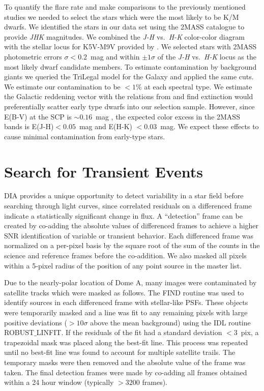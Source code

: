 To quantify the flare rate and make comparisons to the previously mentioned studies we needed to select the stars which were the most likely to be K/M dwarfs. We identified the stars in our data set using the 2MASS catalogue \citep{Skrutskie2006} to provide \textit{JHK} magnitudes. We combined the \textit{J-H} vs.~\textit{H-K} color-color diagram with the stellar locus for K5V-M9V provided by \citet{Pecaut2013}. We selected stars with 2MASS photometric errors $\sigma < 0.2$~mag and within $\pm1\sigma$ of the \textit{J-H} vs.~\textit{H-K} locus as the most likely dwarf candidate members. To estimate contamination by background giants we queried the TriLegal model \citep{Girardi2012} for the Galaxy and applied the same cuts. We estimate our contamination to be $<1\%$ at each spectral type. We estimate the Galactic reddening vector with the relations from \citet{Fitzpatrick1999} and find extinction would preferentially scatter early type dwarfs into our selection sample. However, since E(B-V) at the SCP is $\sim0.16$~mag \citet{Schlafly2011}, the expected color excess in the 2MASS bands is E(J-H)$<0.05$~mag and E(H-K) $< 0.03$~mag.  We expect these effects to cause minimal contamination from early-type stars.

\section{Search for Transient Events}

DIA provides a unique opportunity to detect variability in a star field before searching through light curves, since correlated residuals on a differenced frame indicate a statistically significant change in flux. A ``detection'' frame can be created by co-adding the absolute values of differenced frames to achieve a higher SNR identification of variable or transient behavior. Each differenced frame was normalized on a per-pixel basis by the square root of the sum of the counts in the science and reference frames before the co-addition. We also masked all pixels within a 5-pixel radius of the position of any point source in the master list.

Due to the nearly-polar location of Dome A, many images were contaminated by satellite tracks which were masked as follows. The FIND routine was used to identify sources in each differenced frame with stellar-like PSFs. These objects were temporarily masked and a line was fit to any remaining pixels with large positive deviations ($>10\sigma$ above the mean background) using the IDL routine ROBUST$\_$LINFIT. If the residuals of the fit had a standard deviation $<3$~pix, a trapezoidal mask was placed along the best-fit line. This process was repeated until no best-fit line was found to account for multiple satellite trails. The temporary masks were then removed and the absolute value of the frame was taken. The final detection frames were made by co-adding all frames obtained within a 24 hour window (typically $>3200$ frames).

